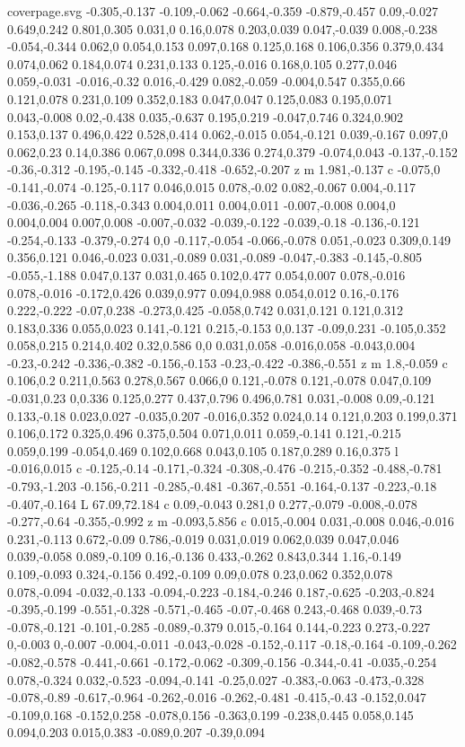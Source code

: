 \begin{filecontents}[noheader]{coverpage.svg}
-0.305,-0.137 -0.109,-0.062 -0.664,-0.359 -0.879,-0.457 0.09,-0.027 0.649,0.242 0.801,0.305 0.031,0 0.16,0.078 0.203,0.039 0.047,-0.039 0.008,-0.238 -0.054,-0.344 0.062,0 0.054,0.153 0.097,0.168 0.125,0.168 0.106,0.356 0.379,0.434 0.074,0.062 0.184,0.074 0.231,0.133 0.125,-0.016 0.168,0.105 0.277,0.046 0.059,-0.031 -0.016,-0.32 0.016,-0.429 0.082,-0.059 -0.004,0.547 0.355,0.66 0.121,0.078 0.231,0.109 0.352,0.183 0.047,0.047 0.125,0.083 0.195,0.071 0.043,-0.008 0.02,-0.438 0.035,-0.637 0.195,0.219 -0.047,0.746 0.324,0.902 0.153,0.137 0.496,0.422 0.528,0.414 0.062,-0.015 0.054,-0.121 0.039,-0.167 0.097,0 0.062,0.23 0.14,0.386 0.067,0.098 0.344,0.336 0.274,0.379 -0.074,0.043 -0.137,-0.152 -0.36,-0.312 -0.195,-0.145 -0.332,-0.418 -0.652,-0.207 z m 1.981,-0.137 c -0.075,0 -0.141,-0.074 -0.125,-0.117 0.046,0.015 0.078,-0.02 0.082,-0.067 0.004,-0.117 -0.036,-0.265 -0.118,-0.343 0.004,0.011 0.004,0.011 -0.007,-0.008 0.004,0 0.004,0.004 0.007,0.008 -0.007,-0.032 -0.039,-0.122 -0.039,-0.18 -0.136,-0.121 -0.254,-0.133 -0.379,-0.274 0,0 -0.117,-0.054 -0.066,-0.078 0.051,-0.023 0.309,0.149 0.356,0.121 0.046,-0.023 0.031,-0.089 0.031,-0.089 -0.047,-0.383 -0.145,-0.805 -0.055,-1.188 0.047,0.137 0.031,0.465 0.102,0.477 0.054,0.007 0.078,-0.016 0.078,-0.016 -0.172,0.426 0.039,0.977 0.094,0.988 0.054,0.012 0.16,-0.176 0.222,-0.222 -0.07,0.238 -0.273,0.425 -0.058,0.742 0.031,0.121 0.121,0.312 0.183,0.336 0.055,0.023 0.141,-0.121 0.215,-0.153 0,0.137 -0.09,0.231 -0.105,0.352 0.058,0.215 0.214,0.402 0.32,0.586 0,0 0.031,0.058 -0.016,0.058 -0.043,0.004 -0.23,-0.242 -0.336,-0.382 -0.156,-0.153 -0.23,-0.422 -0.386,-0.551 z m 1.8,-0.059 c 0.106,0.2 0.211,0.563 0.278,0.567 0.066,0 0.121,-0.078 0.121,-0.078 0.047,0.109 -0.031,0.23 0,0.336 0.125,0.277 0.437,0.796 0.496,0.781 0.031,-0.008 0.09,-0.121 0.133,-0.18 0.023,0.027 -0.035,0.207 -0.016,0.352 0.024,0.14 0.121,0.203 0.199,0.371 0.106,0.172 0.325,0.496 0.375,0.504 0.071,0.011 0.059,-0.141 0.121,-0.215 0.059,0.199 -0.054,0.469 0.102,0.668 0.043,0.105 0.187,0.289 0.16,0.375 l -0.016,0.015 c -0.125,-0.14 -0.171,-0.324 -0.308,-0.476 -0.215,-0.352 -0.488,-0.781 -0.793,-1.203 -0.156,-0.211 -0.285,-0.481 -0.367,-0.551 -0.164,-0.137 -0.223,-0.18 -0.407,-0.164 L 67.09,72.184 c 0.09,-0.043 0.281,0 0.277,-0.079 -0.008,-0.078 -0.277,-0.64 -0.355,-0.992 z m -0.093,5.856 c 0.015,-0.004 0.031,-0.008 0.046,-0.016 0.231,-0.113 0.672,-0.09 0.786,-0.019 0.031,0.019 0.062,0.039 0.047,0.046 0.039,-0.058 0.089,-0.109 0.16,-0.136 0.433,-0.262 0.843,0.344 1.16,-0.149 0.109,-0.093 0.324,-0.156 0.492,-0.109 0.09,0.078 0.23,0.062 0.352,0.078 0.078,-0.094 -0.032,-0.133 -0.094,-0.223 -0.184,-0.246 0.187,-0.625 -0.203,-0.824 -0.395,-0.199 -0.551,-0.328 -0.571,-0.465 -0.07,-0.468 0.243,-0.468 0.039,-0.73 -0.078,-0.121 -0.101,-0.285 -0.089,-0.379 0.015,-0.164 0.144,-0.223 0.273,-0.227 0,-0.003 0,-0.007 -0.004,-0.011 -0.043,-0.028 -0.152,-0.117 -0.18,-0.164 -0.109,-0.262 -0.082,-0.578 -0.441,-0.661 -0.172,-0.062 -0.309,-0.156 -0.344,-0.41 -0.035,-0.254 0.078,-0.324 0.032,-0.523 -0.094,-0.141 -0.25,0.027 -0.383,-0.063 -0.473,-0.328 -0.078,-0.89 -0.617,-0.964 -0.262,-0.016 -0.262,-0.481 -0.415,-0.43 -0.152,0.047 -0.109,0.168 -0.152,0.258 -0.078,0.156 -0.363,0.199 -0.238,0.445 0.058,0.145 0.094,0.203 0.015,0.383 -0.089,0.207 -0.39,0.094 
\end{filecontents}
